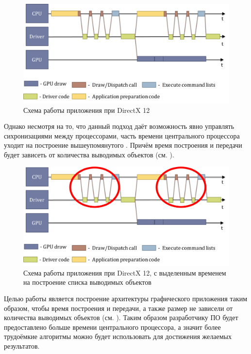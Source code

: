 \begin{figure}[ht!] 
	\center
	\includegraphics [scale=0.23] {my_folder/images//pipeline_dx12}
	\caption{Схема работы приложения при DirectX 12} 
	\label{fig:pipeline_dx12}  
\end{figure}

Однако несмотря на то, что данный подход даёт возможность явно управлять сихронизациями между процессорами, часть времени центрального процессора уходит на построение вышеупомянутого . Причём время построения и передачи будет зависеть от количества выводимых объектов (см. ).

\begin{figure}[ht!] 
	\center
	\includegraphics [scale=0.23] {my_folder/images//pipeline_dx12_circles}
	\caption{Схема работы приложения при DirectX 12, с выделенным временем на построение списка выводимых объектов} 
	\label{fig:pipeline_dx12_circles}  
\end{figure}

Целью работы является построение архитектуры графического приложения таким образом, чтобы время построения и передачи, а также размер  не зависели от количества выводимых объектов (см. ). Таким образом разработчику ПО будет предоставлено больше времени центрального процессора, а значит более трудоёмкие алгоритмы можно будет использовать для достижения желаемых результатов.

